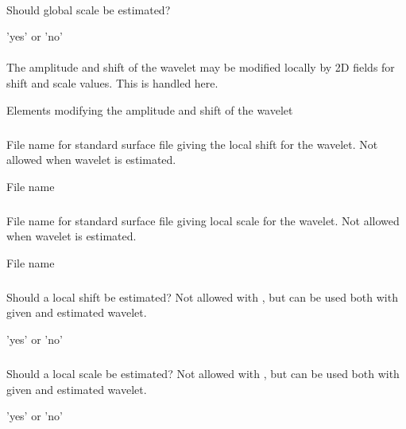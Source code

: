 \paragraph{}
 \slist
   \item \Description Should global scale be estimated?
   \item \Argument 'yes' or 'no'
   \item \Default
 \elist

\paragraph{}
 \slist
   \item \Description The amplitude and shift of the wavelet may be modified locally by 2D fields for shift and scale values. This is handled here.
   \item \Argument Elements modifying the amplitude and shift of the wavelet
   \item \Default
 \elist

\subparagraph{}
 \slist
   \item \Description File name for standard surface file giving the local shift for the wavelet. Not allowed when wavelet is estimated.
   \item \Argument File name
   \item \Default
 \elist

\subparagraph{}
 \slist
   \item \Description File name for standard surface file giving local scale for the wavelet. Not allowed when wavelet is estimated.
   \item \Argument File name
   \item \Default
 \elist

\subparagraph{}
 \slist
   \item \Description Should a local shift be estimated? Not allowed with , but can be used both with given and estimated wavelet.
   \item \Argument 'yes' or 'no'
   \item \Default
 \elist

\subparagraph{}
 \slist
   \item \Description Should a local scale be estimated? Not allowed with , but can be used both with given and estimated wavelet.
   \item \Argument 'yes' or 'no'
   \item \Default
 \elist

